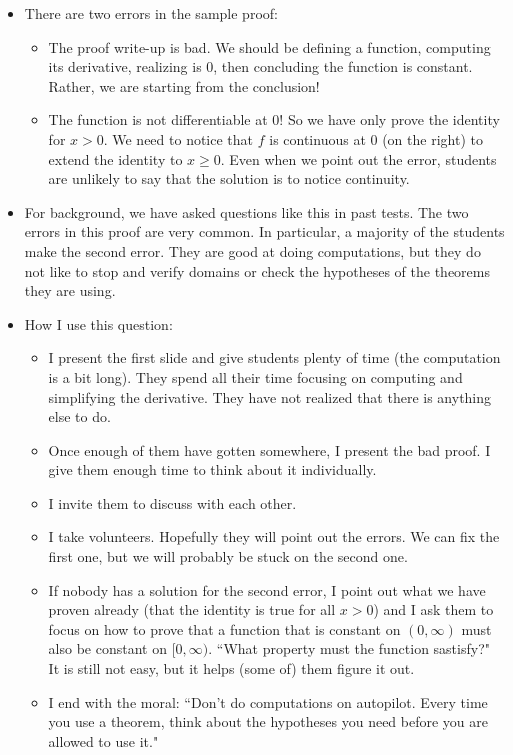 \documentclass[11pt]{article}
\newcommand{\nl}{\hfill \vspace{-1.1\baselineskip}} %
\begin{document}
\begin{comments}
\nl
\begin{itemize}
\item There are two errors in the sample proof:
	\begin{itemize}
		\item  The proof write-up is bad.  We should be defining a function, computing its derivative, realizing is 0, then concluding the function is constant.  Rather, we are starting from the conclusion!
		\item The function is not differentiable at 0!  So we have only prove the identity for $x>0$.  We need to notice that $f$ is continuous at $0$ (on the right) to extend the identity to $x \geq 0$.   Even when we point out the error, students are unlikely to say that the solution is to notice continuity.
	\end{itemize}
\item For background, we have asked questions like this in past tests.   The two errors in this proof are very common.  In particular, a majority of the students make the second error.  They are good at doing computations, but they do not like to stop and verify domains or check the hypotheses of the theorems they are using.
\item How I use this question:
	\begin{itemize}
		\item I present the first slide and give students plenty of time (the computation is a bit long).  They spend all their time focusing on computing and simplifying the derivative.  They have not realized that there is anything else to do.
		\item Once enough of them have gotten somewhere, I present the bad proof.  I give them enough time to think about it individually.  
		\item I invite them to discuss with each other.
		\item I take volunteers.  Hopefully they will point out the errors.  We can fix the first one, but we will probably be stuck on the second one.
		\item If nobody has a solution for the second error, I point out what we have proven already (that the identity is true for all $x>0$) and I ask them to focus on how to prove that a function that is constant on $(0, \infty)$ must also be constant on $[0, \infty)$.  ``What property must the function sastisfy?"  It is still not easy, but it helps (some of) them figure it out.
		\item I end with the moral: ``Don't do computations on autopilot.  Every time you use a theorem, think about the hypotheses you need before you are allowed to use it."
	\end{itemize}
\end{itemize}	
\end{comments}
\end{document}
